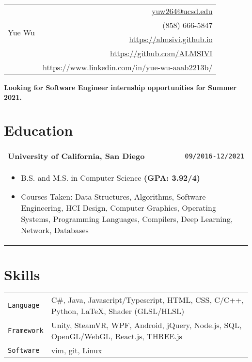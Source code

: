 \documentclass[10pt, letterpaper]{article}
\newcommand{\itemcols}[1]{
\multicolumn{2}{p{\dimexpr \linewidth-2\tabcolsep}}{
\begin{itemize}
#1
\end{itemize}
}
}
\begin{document}
\noindent
\begin{tabularx}{\linewidth}{X r}
\multirow{4}{*}{{\fontsize{50}{60}\selectfont Yue Wu}}
& \href{mailto:yuw264@ucsd.edu}{yuw264@ucsd.edu} \\
& (858) 666-5847 \\
& \href{https://almsivi.github.io}{https://almsivi.github.io} \\
& \href{https://github.com/ALMSIVI}{https://github.com/ALMSIVI} \\
& \href{https://www.linkedin.com/in/yue-wu-aaab2213b/}{https://www.linkedin.com/in/yue-wu-aaab2213b/}
\end{tabularx}
\noindent
\textbf{Looking for Software Engineer internship opportunities for Summer 2021.}
\section{Education}
\smallskip
\noindent
\begin{tabularx}{\linewidth}{X r}
\textbf{\large University of California, San Diego} & \texttt{09/2016-12/2021} \\
\itemcols{
\item B.S. and M.S. in Computer Science \textbf{(GPA: 3.92/4)}
\item Courses Taken: Data Structures, Algorithms, Software Engineering, HCI Design, Computer Graphics, Operating Systems, Programming Languages, Compilers, Deep Learning, Network, Databases
}
\end{tabularx}
\section{Skills}
\smallskip
\noindent
\begin{tabularx}{\linewidth}{l X}
\texttt{Language} & C\#, Java, Javascript/Typescript, HTML, CSS, C/C++, Python, \LaTeX, Shader (GLSL/HLSL) \\
\texttt{Framework} & Unity, SteamVR, WPF, Android, jQuery, Node.js, SQL, OpenGL/WebGL, React.js, THREE.js \\
\texttt{Software} & vim, git, Linux
\end{tabularx}
\end{document}
